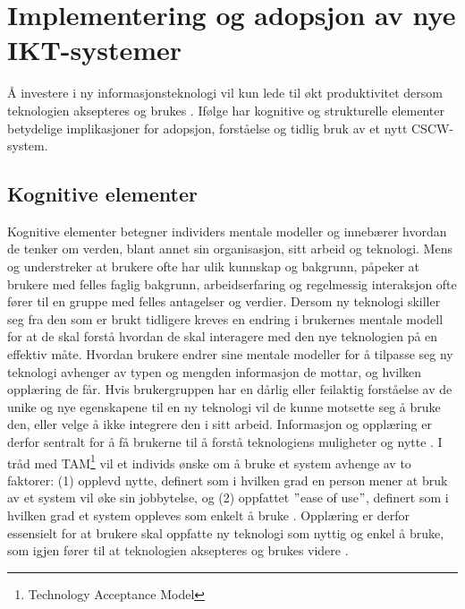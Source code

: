 \section{Implementering og adopsjon av nye IKT-systemer}
\label{sec:implementering}
Å investere i ny informasjonsteknologi vil kun lede til økt produktivitet dersom teknologien aksepteres og brukes \citep{Venkatesh99}. Ifølge \citet{Orlikowski92} har kognitive og strukturelle elementer betydelige implikasjoner for adopsjon, forståelse og tidlig bruk av et nytt CSCW-system. 

\subsection{Kognitive elementer}
\label{sec:kognitive_elementer}
Kognitive elementer betegner individers mentale modeller og innebærer hvordan de tenker om verden, blant annet sin organisasjon, sitt arbeid og teknologi. Mens \citet{Berg99} og \citet{Ackerman00} understreker at brukere ofte har ulik kunnskap og bakgrunn, påpeker \citet{Orlikowski92} at brukere med felles faglig bakgrunn, arbeidserfaring og regelmessig interaksjon ofte fører til en gruppe med felles antagelser og verdier. Dersom ny teknologi skiller seg fra den som er brukt tidligere kreves en endring i brukernes mentale modell for at de skal forstå hvordan de skal interagere med den nye teknologien på en effektiv måte. Hvordan brukere endrer sine mentale modeller for å tilpasse seg ny teknologi avhenger av typen og mengden informasjon de mottar, og hvilken opplæring de får. Hvis brukergruppen har en dårlig eller feilaktig forståelse av de unike og nye egenskapene til en ny teknologi vil de kunne motsette seg å bruke den, eller velge å ikke integrere den i sitt arbeid. Informasjon og opplæring er derfor sentralt for å få brukerne til å forstå teknologiens muligheter og nytte \citep{Orlikowski92}. I tråd med TAM\footnote{Technology Acceptance Model} vil et individs ønske om å bruke et system avhenge av to faktorer: (1) opplevd nytte, definert som i hvilken grad en person mener at bruk av et system vil øke sin jobbytelse, og (2) oppfattet $"$ease of use$"$, definert som i hvilken grad et system oppleves som enkelt å bruke \citep{Venkatesh00}. Opplæring er derfor essensielt for at brukere skal oppfatte ny teknologi som nyttig og enkel å bruke, som igjen fører til at teknologien aksepteres og brukes videre \citep{Venkatesh99}.

